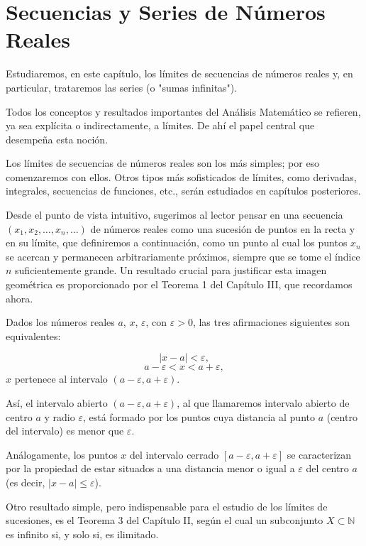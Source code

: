 \documentclass[12pt,oneside]{book}
\begin{document}
\newpage

\chapter{Secuencias y Series de Números Reales}

Estudiaremos, en este capítulo, los límites de secuencias de números reales y, en particular, trataremos las series (o "sumas infinitas").

Todos los conceptos y resultados importantes del Análisis Matemático se refieren, ya sea explícita o indirectamente, a límites. De ahí el papel central que desempeña esta noción.

Los límites de secuencias de números reales son los más simples; por eso comenzaremos con ellos. Otros tipos más sofisticados de límites, como derivadas, integrales, secuencias de funciones, etc., serán estudiados en capítulos posteriores.

Desde el punto de vista intuitivo, sugerimos al lector pensar en una secuencia \((x_1, x_2, \dots, x_n, \dots)\) de números reales como una sucesión de puntos en la recta y en su límite, que definiremos a continuación, como un punto al cual los puntos \(x_n\) se acercan y permanecen arbitrariamente próximos, siempre que se tome el índice \(n\) suficientemente grande. Un resultado crucial para justificar esta imagen geométrica es proporcionado por el Teorema 1 del Capítulo III, que recordamos ahora.

Dados los números reales \(a\), \(x\), \(\varepsilon\), con \(\varepsilon > 0\), las tres afirmaciones siguientes son equivalentes:

\[|x - a| < \varepsilon,\]
\[a - \varepsilon < x < a + \varepsilon,\]
\(x\) pertenece al intervalo \((a - \varepsilon, a + \varepsilon)\).

Así, el intervalo abierto \((a - \varepsilon, a + \varepsilon)\), al que llamaremos intervalo abierto de centro \(a\) y radio \(\varepsilon\), está formado por los puntos cuya distancia al punto \(a\) (centro del intervalo) es menor que \(\varepsilon\).

Análogamente, los puntos \(x\) del intervalo cerrado \([a - \varepsilon, a + \varepsilon]\) se caracterizan por la propiedad de estar situados a una distancia menor o igual a \(\varepsilon\) del centro \(a\) (es decir, \(|x - a| \leq \varepsilon\)).

Otro resultado simple, pero indispensable para el estudio de los límites de sucesiones, es el Teorema 3 del Capítulo II, según el cual un subconjunto \(X \subset \mathbb{N}\) es infinito si, y solo si, es ilimitado.
\end{document}
